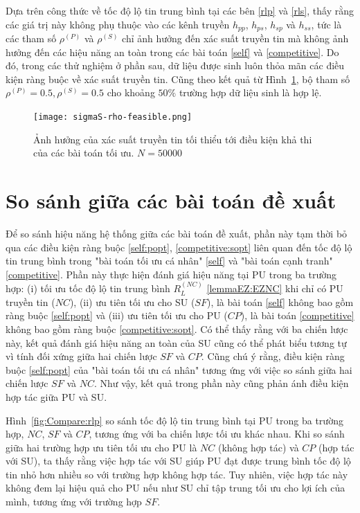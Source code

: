 \documentclass[../main.tex]{subfiles}
\begin{document}
Dựa trên công thức về tốc độ lộ tin trung bình tại các bên \eqref{rlp} và \eqref{rls}, thấy rằng các giá trị này không phụ thuộc vào các kênh truyền $h_{pp}$, $h_{ps}$, $h_{sp}$ và $h_{ss}$, tức là các tham số $\rho^{(P)}$ và $\rho^{(S)}$ chỉ ảnh hưởng đến xác suất truyền tin mà không ảnh hưởng đến các hiệu năng an toàn trong các bài toán \eqref{self} và \eqref{competitive}. Do đó, trong các thử nghiệm ở phần sau, dữ liệu được sinh luôn thỏa mãn các điều kiện ràng buộc về xác suất truyền tin. Cũng theo kết quả từ Hình~\ref{fig:Feasibility:rho}, bộ tham số $\rho^{(P)} = 0.5, \rho^{(S)} = 0.5$ cho khoảng $50\%$ trường hợp dữ liệu sinh là hợp lệ.

\begin{figure}
\centering
\captionsetup{justification=centering}
\texttt{[image: sigmaS-rho-feasible.png]}
\caption{Ảnh hưởng của xác suất truyền tin tối thiểu tới điều kiện khả thi của các bài toán tối ưu. $N = 50000$}
\label{fig:Feasibility:rho}
\end{figure}

\section{So sánh giữa các bài toán đề xuất}

Để so sánh hiệu năng hệ thống giữa các bài toán đề xuất, phần này tạm thời bỏ qua các điều kiện ràng buộc \eqref{self:popt}, \eqref{competitive:sopt} liên quan đến tốc độ lộ tin trung bình trong "bài toán tối ưu cá nhân" \eqref{self} và "bài toán cạnh tranh" \eqref{competitive}. Phần này thực hiện đánh giá hiệu năng tại PU trong ba trường hợp: (i) tối ưu tốc độ lộ tin trung bình $R_L^{(NC)}$ \eqref{lemmaEZ:EZNC} khi chỉ có PU truyền tin ($NC$), (ii) ưu tiên tối ưu cho SU ($SF$), là bài toán \eqref{self} không bao gồm ràng buộc \eqref{self:popt} và (iii) ưu tiên tối ưu cho PU ($CP$), là bài toán \eqref{competitive}
không bao gồm ràng buộc \eqref{competitive:sopt}. Có thể thấy rằng với ba chiến lược này, kết quả đánh giá hiệu năng an toàn của SU cũng có thể phát biểu tương tự vì tính đối xứng giữa hai chiến lược $SF$ và $CP$. Cũng chú ý rằng, điều kiện ràng buộc \eqref{self:popt} của "bài toán tối ưu cá nhân" tương ứng với việc so sánh giữa hai chiến lược $SF$ và $NC$. Như vậy, kết quả trong phần này cũng phản ánh điều kiện hợp tác giữa PU và SU.

Hình~\ref{fig:Compare:rlp} so sánh tốc độ lộ tin trung bình tại PU trong ba trường hợp, $NC$, $SF$ và $CP$, tương ứng với ba chiến lược tối ưu khác nhau. Khi so sánh giữa hai trường hợp ưu tiên tối ưu cho PU là $NC$ (không hợp tác) và $CP$ (hợp tác với SU), ta thấy rằng việc hợp tác với SU giúp PU đạt được trung bình tốc độ lộ tin nhỏ hơn nhiều so với trường hợp không hợp tác. Tuy nhiên, việc hợp tác này không đem lại hiệu quả cho PU nếu như SU chỉ tập trung tối ưu cho lợi ích của mình, tương ứng với trường hợp $SF$.
\end{document}
